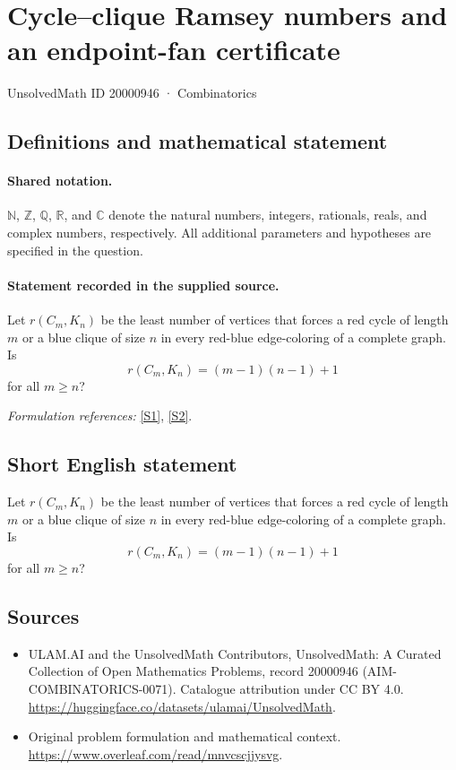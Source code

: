 \documentclass[11pt]{article}
\newcommand{\sref}[2]{\hyperlink{source:#1:#2}{[S#2]}}
\begin{document}
\setcounter{section}{20000945}
\section{Cycle--clique Ramsey numbers and an endpoint-fan certificate}\label{20000946}
{\small UnsolvedMath ID 20000946 · Combinatorics}
\subsection{Definitions and mathematical statement}

\paragraph{Shared notation.}$\mathbb N$, $\mathbb Z$, $\mathbb Q$, $\mathbb R$, and $\mathbb C$ denote the natural numbers, integers, rationals, reals, and complex numbers, respectively. All additional parameters and hypotheses are specified in the question.


\paragraph{Statement recorded in the supplied source.}
Let $r(C_m,K_n)$ be the least number of vertices that forces a red cycle of length $m$ or a blue clique of size $n$ in every red-blue edge-coloring of a complete graph. Is
\[r(C_m,K_n)=(m-1)(n-1)+1\]
for all $m\geq n$?
\par\smallskip\textit{Formulation references:} \sref{20000946}{1}, \sref{20000946}{2}.
\subsection{Short English statement}
Let $r(C_m,K_n)$ be the least number of vertices that forces a red cycle of length $m$ or a blue clique of size $n$ in every red-blue edge-coloring of a complete graph. Is
\[r(C_m,K_n)=(m-1)(n-1)+1\]
for all $m\geq n$?
\subsection{Sources}
\begin{itemize}
\item[\hypertarget{source:20000946:1}{S1}] ULAM.AI and the UnsolvedMath Contributors, UnsolvedMath: A Curated Collection of Open Mathematics Problems, record 20000946 (AIM-COMBINATORICS-0071). Catalogue attribution under CC BY 4.0.
\url{https://huggingface.co/datasets/ulamai/UnsolvedMath}.
\item[\hypertarget{source:20000946:2}{S2}] Original problem formulation and mathematical context.
\url{https://www.overleaf.com/read/mnvcscjjysvg}.
\end{itemize}
\label{end:20000946}
\end{document}
